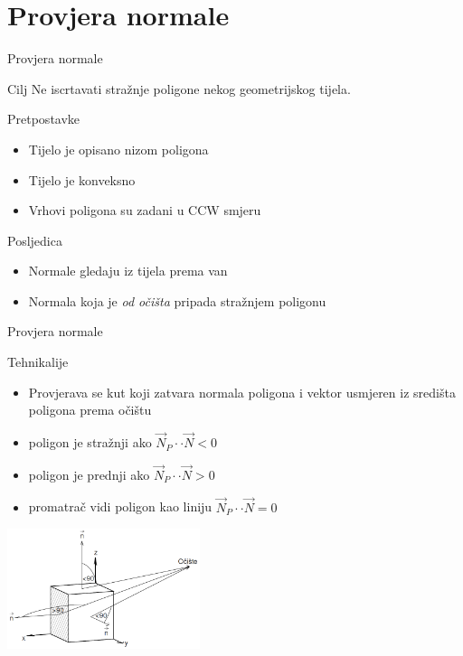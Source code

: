 \documentclass[9pt]{beamer}
\begin{document}
\section{Provjera normale}
\begin{frame}{Provjera normale}
	\begin{block}{Cilj}
		Ne iscrtavati stražnje poligone nekog geometrijskog tijela.
	\end{block}
	\begin{block}{Pretpostavke}
		\begin{itemize}
			\item Tijelo je opisano nizom poligona
			\item Tijelo je konveksno
			\item Vrhovi poligona su zadani u CCW smjeru
		\end{itemize}
	\end{block}
	\begin{block}{Posljedica}
		\begin{itemize}
			\item Normale gledaju iz tijela prema van
			\item Normala koja je \textit{od očišta} pripada stražnjem poligonu
		\end{itemize}
	\end{block}
\end{frame}
\begin{frame}{Provjera normale}
	\begin{block}{Tehnikalije}
		\begin{itemize}
			\item Provjerava se kut koji zatvara normala poligona i vektor usmjeren iz središta poligona prema očištu
			\item poligon je stražnji ako $\vec{N}_P\cdot \cdot \vec{N} < 0$
			\item poligon je prednji ako $\vec{N}_P\cdot \cdot \vec{N} > 0$
			\item promatrač vidi poligon kao liniju $\vec{N}_P\cdot \cdot \vec{N} = 0$
		\end{itemize}
	\end{block}
	\begin{center}
		\includegraphics[height=3.5cm]{./slike/provjera_normala.png}
	\end{center}
\end{frame}
\end{document}

